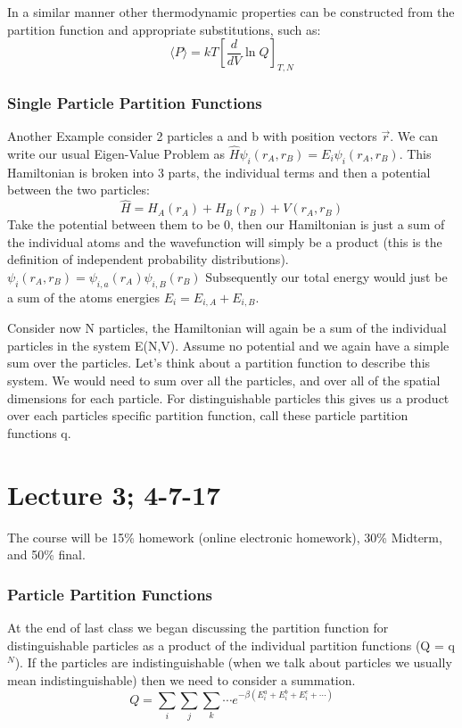 \documentclass{article}
\begin{document}
In a similar manner other thermodynamic properties can be constructed from the partition function and appropriate substitutions, such as:
\begin{equation}
\langle P \rangle = kT \left [ \frac{d}{dV} \ln Q \right ]_{T,N}
\end{equation}

\subsubsection*{Single Particle Partition Functions}
Another Example consider 2 particles a and b with position vectors $\vec{r}$. 
We can write our usual Eigen-Value Problem as  $\hat{H}\psi_i(r_A,r_B) = E_i \psi_i(r_A,r_B)$. 
This Hamiltonian is broken into 3 parts, the individual terms and then a potential between the two particles:
\begin{equation}
\hat{H} = H_A(r_A) + H_B(r_B) + V(r_A,r_B)
\end{equation}
Take the potential between them to be 0, then our Hamiltonian is just a sum of the individual atoms and the wavefunction will simply be a product (this is the definition of independent probability distributions).
$\psi_i(r_A,r_B) = \psi_{i,a}(r_A) \psi_{i,B}(r_B)$
Subsequently our total energy would just be a sum of the atoms energies $E_i = E_{i,A} + E_{i,B}$.

Consider now N particles, the Hamiltonian will again be a sum of the individual particles in the system E(N,V). 
Assume no potential and we again have a simple sum over the particles. 
Let's think about a partition function to describe this system. 
We would need to sum over all the particles, and over all of the spatial dimensions for each particle. 
For distinguishable particles this gives us a product over each particles specific partition function, call these particle partition functions q. 

\section{Lecture 3; 4-7-17}
The course will be 15\% homework (online electronic homework), 30\% Midterm, and 50\% final. 

\subsubsection*{Particle Partition Functions}
At the end of last class we began discussing the partition function for distinguishable particles as a product of the individual partition functions (Q = q$^N$).
If the particles are indistinguishable (when we talk about particles we usually mean indistinguishable) then we need to consider a summation. 
\begin{equation}
Q = \sum_i \sum_j \sum_k \cdots  e^{-\beta (E_i^a + E_i^b + E_i^c + \cdots)}
\end{equation}
\end{document}
